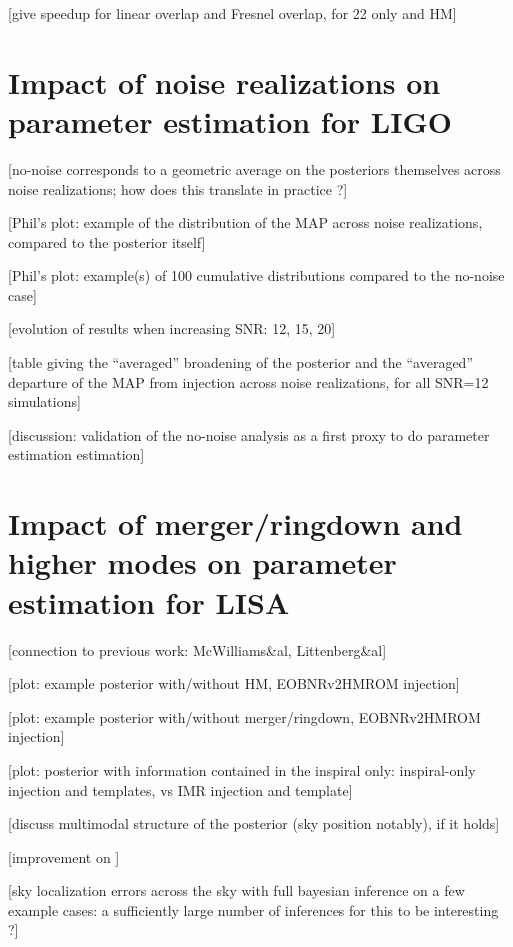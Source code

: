 \documentclass[aps,showpacs,twocolumn,prd,superscriptaddress,nofootinbib]{revtex4}
\begin{document}
[give speedup for linear overlap and Fresnel overlap, for 22 only and HM]


\section{Impact of noise realizations on parameter estimation for LIGO}
\label{sec:noiseligo}

[no-noise corresponds to a geometric average on the posteriors themselves across noise realizations; how does this translate in practice ?]

[Phil's plot: example of the distribution of the MAP across noise realizations, compared to the posterior itself]

[Phil's plot: example(s) of 100 cumulative distributions compared to the no-noise case]

[evolution of results when increasing SNR: 12, 15, 20]

[table giving the ``averaged'' broadening of the posterior and the ``averaged'' departure of the MAP from injection across noise realizations, for all SNR=12 simulations]

[discussion: validation of the no-noise analysis as a first proxy to do parameter estimation estimation]


\section{Impact of merger/ringdown and higher modes on parameter estimation for LISA}
\label{sec:pelisa}

[connection to previous work: McWilliams\&al, Littenberg\&al]

[plot: example posterior with/without HM, EOBNRv2HMROM injection]

[plot: example posterior with/without merger/ringdown, EOBNRv2HMROM injection]

[plot: posterior with information contained in the inspiral only: inspiral-only injection and templates, vs IMR injection and template]

[discuss multimodal structure of the posterior (sky position notably), if it holds]

[improvement on ]

[sky localization errors across the sky with full bayesian inference on a few example cases: a sufficiently large number of inferences for this to be interesting ?]
\end{document}
